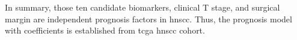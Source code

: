 \documentclass[jpm,article,submit,moreauthors,pdftex]{Definitions/mdpi}
\begin{document}
In summary, those ten candidate biomarkers, clinical T stage, and surgical margin are independent prognosis factors in \acrshort{hnscc}.
Thus, the prognosis model with coefficients is established from \acrshort{tcga} \acrshort{hnscc} cohort. 
\end{document}
